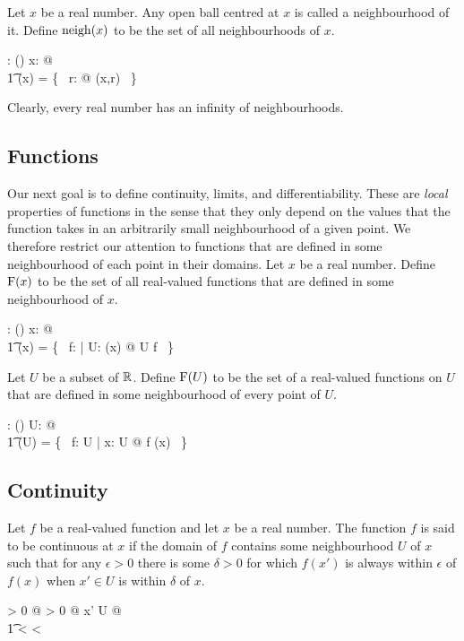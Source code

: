 \documentclass[11pt, oneside]{article}
\begin{document}
Let $x$ be a real number.
Any open ball centred at $x$ is called a neighbourhood of it.
Define $\operatorname{neigh}(x)$ to be the set of all neighbourhoods of $x$.

\begin{axdef}
	\neighR: \R \fun \power (\power \R)
\where
	\forall x: \R @ \\
	\t1	\neighR(x) = \{~ r: \Rpos @ \ballRR(x,r) ~\}
\end{axdef}
Clearly, every real number has an infinity of neighbourhoods.

\subsection{Functions}

Our next goal is to define continuity, limits, and differentiability.
These are {\it local} properties of functions
in the sense that they only depend on the values that the function takes in an arbitrarily small neighbourhood of a given point.
We therefore restrict our attention to functions that are defined in some neighbourhood of each point in their domains.
Let $x$ be a real number. 
Define $\operatorname{F}(x)$ to be the set of all real-valued functions that are defined in some neighbourhood of $x$.
\begin{axdef}
	\FunR: \R \fun \power(\R \pfun \R)
\where
	\forall x: \R @ \\
	\t1	\FunR(x) = \{~ f: \R \pfun \R | \exists U: \neighR(x) @ U \subseteq \dom f ~\}
\end{axdef}

Let $U$ be a subset of $\mathbb{R}$.
Define $\operatorname{F}(U)$ to be the set of a real-valued functions on $U$ that are defined in some neighbourhood of every point of $U$.
\begin{axdef}
	\FunPR: \power \R \fun \power (\R \pfun \R)
\where
	\forall U: \power \R @ \\
	\t1	\FunPR(U) = \{~ f: U \fun \R | \forall x: U @ f \in \FunR(x) ~\}
\end{axdef}

\subsection{Continuity}

Let $f$ be a real-valued function and 
let $x$ be a real number.
The function $f$ is said to be continuous at $x$ if 
the domain of $f$ contains some neighbourhood $U$ of $x$ such that
for any $\epsilon > 0$ there is some $\delta > 0$ for which 
$f(x')$ is always within $\epsilon$ of $f(x)$
when $x' \in U$ is within $\delta$ of $x$.
\begin{argue}
\forall \epsilon > 0 @ \exists \delta > 0 @ \forall x' \in U @ \\
\t1	 < \delta \implies {} < \epsilon
\end{argue}
\end{document}
